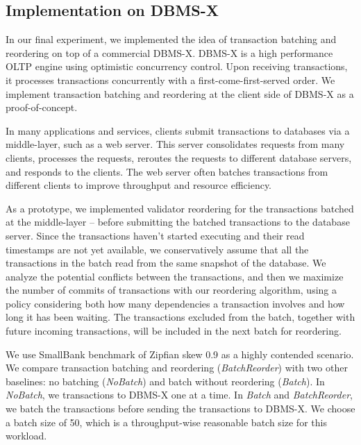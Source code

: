 \subsection{Implementation on DBMS-X}
\label{subsec:experiment:compare}

In our final experiment, we implemented the idea of transaction batching and reordering on top of a commercial DBMS-X. DBMS-X is a high performance OLTP engine using optimistic concurrency control. Upon receiving transactions, it processes transactions concurrently with a first-come-first-served order. We implement transaction batching and reordering at the client side of DBMS-X as a proof-of-concept.

In many applications and services, clients submit transactions to databases via a middle-layer, such as a web server. This server consolidates requests from many clients, processes the requests, reroutes the requests to different database servers, and responds to the clients. The web server often batches transactions from different clients to improve throughput and resource efficiency. 

As a prototype, we implemented validator reordering for the transactions batched at the middle-layer -- before submitting the batched transactions to the database server. Since the transactions haven't started executing and their read timestamps are not yet available, we conservatively assume that all the transactions in the batch read from the same snapshot of the database. We analyze the potential conflicts between the transactions, and then we maximize the number of commits of transactions with our reordering algorithm, using a policy considering both how many dependencies a transaction involves and how long it has been waiting. The transactions excluded from the batch, together with future incoming transactions, will be included in the next batch for reordering.

We use SmallBank benchmark of Zipfian skew 0.9 as a highly contended scenario. We compare transaction batching and reordering (\emph{BatchReorder}) with two other baselines: no batching (\emph{NoBatch}) and batch without reordering (\emph{Batch}). In \emph{NoBatch}, we transactions to DBMS-X one at a time. In \emph{Batch} and \emph{BatchReorder}, we batch the transactions before sending the transactions to DBMS-X. We choose a batch size of 50, which is a throughput-wise reasonable batch size for this workload.

